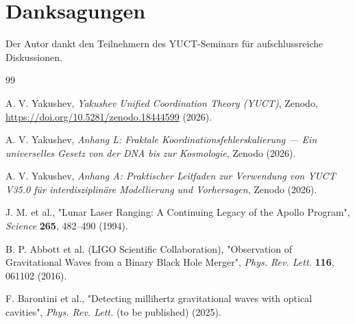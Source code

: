 \documentclass[12pt,a4paper]{article}
\begin{document}
	\section*{Danksagungen}
	
	Der Autor dankt den Teilnehmern des YUCT-Seminars für aufschlussreiche Diskussionen.
	
	\begin{thebibliography}{99}
		
		A. V. Yakushev, \emph{Yakushev Unified Coordination Theory (YUCT)}, Zenodo, \url{https://doi.org/10.5281/zenodo.18444599} (2026).
		
		A. V. Yakushev, \emph{Anhang L: Fraktale Koordinationsfehlerskalierung — Ein universelles Gesetz von der DNA bis zur Kosmologie}, Zenodo (2026).
		
		A. V. Yakushev, \emph{Anhang A: Praktischer Leitfaden zur Verwendung von YUCT V35.0 für interdisziplinäre Modellierung und Vorhersagen}, Zenodo (2026).
		
		J. M. et al., "Lunar Laser Ranging: A Continuing Legacy of the Apollo Program", \emph{Science} \textbf{265}, 482–490 (1994).
		
		B. P. Abbott et al. (LIGO Scientific Collaboration), "Observation of Gravitational Waves from a Binary Black Hole Merger", \emph{Phys. Rev. Lett.} \textbf{116}, 061102 (2016).
		
		F. Barontini et al., "Detecting millihertz gravitational waves with optical cavities", \emph{Phys. Rev. Lett.} (to be published) (2025).
		
	\end{thebibliography}
	
\end{document}
